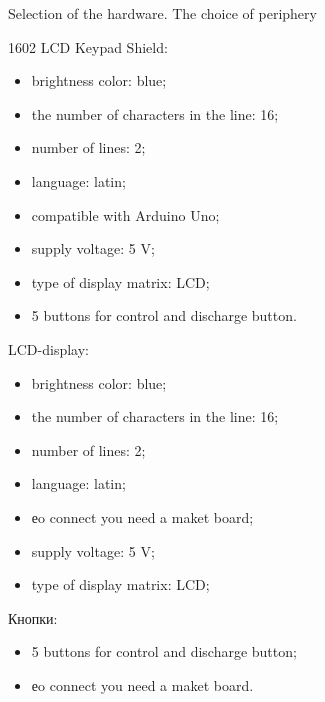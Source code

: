 \documentclass[12pt,a4paper,mathserif]{beamer}
\begin{document}
\begin{frame}{\small Selection of the hardware. The choice of periphery}
    \scriptsize
    \begin{minipage}{0.5\linewidth}
    1602 LCD Keypad Shield:
    \begin{itemize}
        \item brightness color: blue;
        \item the number of characters in the line: 16;
        \item number of lines: 2;
        \item language: latin;
        \item compatible with Arduino Uno;
        \item supply voltage: 5 V;
        \item type of display matrix: LCD;
        \item 5 buttons for control and discharge button.
    \end{itemize}
    \end{minipage}
    \hfill
    \begin{minipage}{0.5\linewidth}
    LCD-display:
    \begin{itemize}
        \item brightness color: blue;
        \item the number of characters in the line: 16;
        \item number of lines: 2;
        \item language: latin;
        \item еo connect you need a maket board;
        \item supply voltage: 5 V;
        \item type of display matrix: LCD;
    \end{itemize}
    Кнопки:
    \begin{itemize}
        \item 5 buttons for control and discharge button;
        \item еo connect you need a maket board.
    \end{itemize}
    \end{minipage}
\end{frame}
\end{document}
